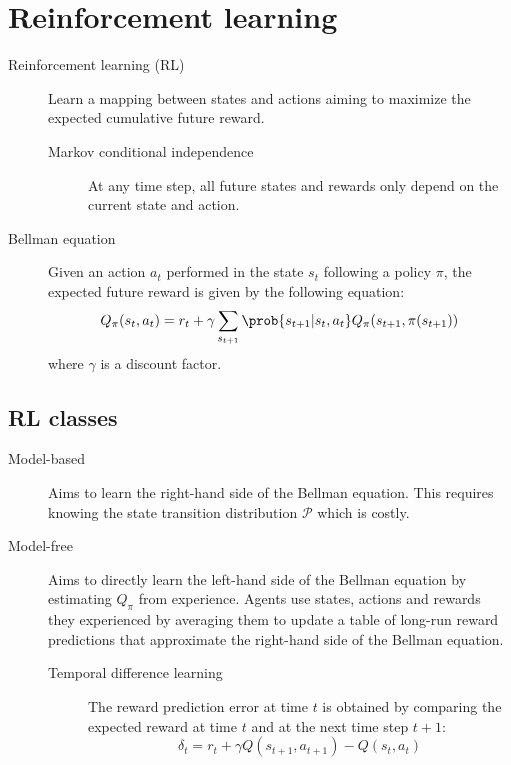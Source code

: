 \section{Reinforcement learning}

\begin{description}
    \item[Reinforcement learning (RL)] 
        Learn a mapping between states and actions aiming to maximize the expected cumulative future reward.

        \begin{description}
            \item[Markov conditional independence] At any time step, all future states and rewards only depend on the current state and action. 
        \end{description}


    \item[Bellman equation] 
        Given an action $a_t$ performed in the state $s_t$ following a policy $\pi$,
        the expected future reward is given by the following equation:
        \[ Q_\pi(s_t, a_t) = r_t + \gamma \sum_{s_{t+1}} \prob{s_{t+1} | s_t, a_t} Q_\pi(s_{t+1}, \pi(s_{t+1})) \]
        where $\gamma$ is a discount factor.
\end{description}


\subsection{RL classes}

\begin{description}
    \item[Model-based] 
        Aims to learn the right-hand side of the Bellman equation.
        This requires knowing the state transition distribution $\mathcal{P}$ which is costly.

    \item[Model-free] 
        Aims to directly learn the left-hand side of the Bellman equation by estimating $Q_\pi$ from experience.
        Agents use states, actions and rewards they experienced by averaging them to update a table of long-run reward predictions that
        approximate the right-hand side of the Bellman equation.

        \begin{description}
            \item[Temporal difference learning] 
                The reward prediction error at time $t$ is obtained by comparing the expected reward at time $t$ and at the next time step $t+1$:
                \[ \delta_t = r_t + \gamma Q(s_{t+1}, a_{t+1}) - Q(s_t, a_t) \]
        \end{description}
\end{description}

